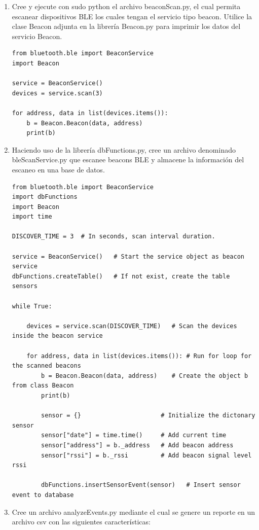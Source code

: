 \documentclass[10pt,letterpaper]{article}
\begin{document}
\begin{enumerate}
\item Cree y ejecute con sudo python el archivo beaconScan.py, el cual permita escanear dispositivos BLE los cuales tengan el servicio tipo beacon. Utilice la clase Beacon adjunta en la librería Beacon.py para imprimir los datos del servicio Beacon. 
\begin{lstlisting}[style=myCustomPythonStyle]
from bluetooth.ble import BeaconService
import Beacon

service = BeaconService()
devices = service.scan(3)

for address, data in list(devices.items()):
    b = Beacon.Beacon(data, address)
    print(b)
\end{lstlisting}

\item Haciendo uso de la librería dbFunctions.py, cree un archivo denominado bleScanService.py que escanee beacons BLE y almacene la información del escaneo en una base de datos. 

\begin{lstlisting}[style=myCustomPythonStyle]
from bluetooth.ble import BeaconService
import dbFunctions
import Beacon
import time

DISCOVER_TIME = 3  # In seconds, scan interval duration.

service = BeaconService()   # Start the service object as beacon service
dbFunctions.createTable()   # If not exist, create the table sensors

while True:

    devices = service.scan(DISCOVER_TIME)   # Scan the devices inside the beacon service

    for address, data in list(devices.items()): # Run for loop for the scanned beacons
        b = Beacon.Beacon(data, address)    # Create the object b from class Beacon
        print(b)

        sensor = {}                      # Initialize the dictonary sensor
        sensor["date"] = time.time()     # Add current time
        sensor["address"] = b._address   # Add beacon address
        sensor["rssi"] = b._rssi         # Add beacon signal level rssi

        dbFunctions.insertSensorEvent(sensor)   # Insert sensor event to database
\end{lstlisting}


\item Cree un archivo analyzeEvents.py mediante el cual se genere un reporte en un archivo csv con las siguientes características:


\end{enumerate}
\end{document}
